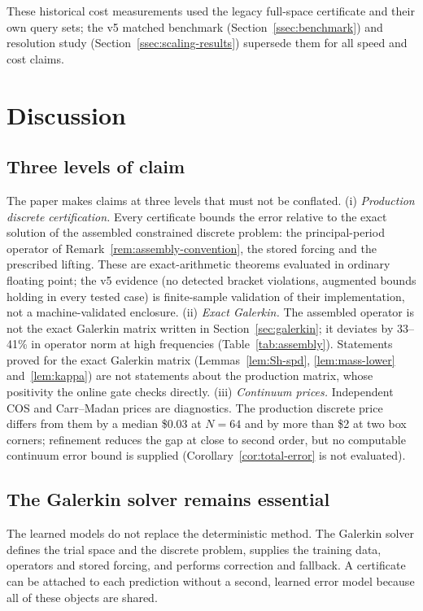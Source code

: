 \documentclass[11pt]{amsart}
\theoremstyle{remark}
\begin{document}
These historical cost measurements used the legacy full-space certificate
and their own query sets; the v5 matched benchmark
(Section~\ref{ssec:benchmark}) and resolution study
(Section~\ref{ssec:scaling-results}) supersede them for all speed and cost
claims.

\section{Discussion}
\label{sec:discussion}

\subsection{Three levels of claim}
The paper makes claims at three levels that must not be conflated.
(i) \emph{Production discrete certification.} Every certificate bounds the
error relative to the exact solution of the assembled constrained discrete
problem: the principal-period operator of
Remark~\ref{rem:assembly-convention}, the stored forcing and the
prescribed lifting. These are exact-arithmetic theorems evaluated in
ordinary floating point; the v5 evidence (no detected bracket violations,
augmented bounds holding in every tested case) is finite-sample validation
of their implementation, not a machine-validated enclosure. (ii)
\emph{Exact Galerkin.} The assembled operator is not the exact Galerkin
matrix written in Section~\ref{sec:galerkin}; it deviates by 33--41\% in
operator norm at high frequencies (Table~\ref{tab:assembly}). Statements
proved for the exact Galerkin matrix (Lemmas~\ref{lem:Sh-spd},
\ref{lem:mass-lower} and~\ref{lem:kappa}) are not statements about the
production matrix, whose positivity the online gate checks directly.
(iii) \emph{Continuum prices.} Independent COS and Carr--Madan prices are
diagnostics. The production discrete price differs from them by a median
\$0.03 at $N=64$ and by more than \$2 at two box corners; refinement
reduces the gap at close to second order, but no computable continuum
error bound is supplied (Corollary~\ref{cor:total-error} is not
evaluated).

\subsection{The Galerkin solver remains essential}
The learned models do not replace the deterministic method. The Galerkin
solver defines the trial space and the discrete problem, supplies the
training data, operators and stored forcing, and performs correction and
fallback. A certificate can be attached to each prediction without a
second, learned error model because all of these objects are shared.
\end{document}
